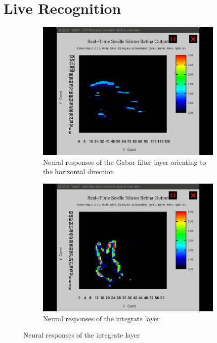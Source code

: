 \section{Live Recognition}
\begin{figure}[h!]
	\centering
	\begin{subfigure}[t]{0.48\textwidth}
		\includegraphics[width=\textwidth]{pics/live1_colour.png}
		\caption{Neural responses of the Gabor filter layer orienting to the horizontal direction~\cite{video1} }
		\label{fig:live1}
	\end{subfigure}
	\begin{subfigure}[t]{0.48\textwidth}
		\includegraphics[width=\textwidth]{pics/live2_colour.png}
		\caption{Neural responses of the integrate layer~\cite{video2}}

\end{subfigure}
\end{figure}
